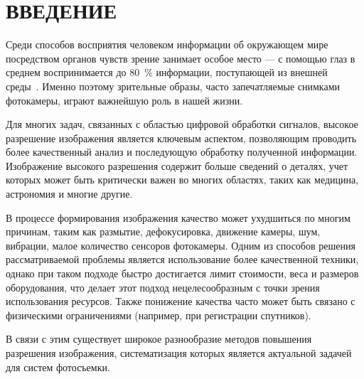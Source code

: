 \chapter*{ВВЕДЕНИЕ}

Среди способов восприятия человеком информации об окружающем мире посредством органов чувств зрение занимает особое место --- с помощью глаз в среднем воспринимается до 80~\% информации, поступающей из внешней среды~\cite{percent}. Именно поэтому зрительные образы, часто запечатляемые снимками фотокамеры, играют важнейшую роль в нашей жизни.

Для многих задач, связанных с областью цифровой обработки сигналов, высокое разрешение изображения является ключевым аспектом, позволяющим проводить более качественный анализ и последующую обработку полученной информации. Изображение высокого разрешения содержит больше сведений о деталях, учет которых может быть критически важен во многих областях, таких как медицина, астрономия и многие другие.

В процессе формирования изображения качество может ухудшиться по многим причинам, таким как размытие, дефокусировка, движение камеры, шум, вибрации, малое количество сенсоров фотокамеры. Одним из способов решения рассматриваемой проблемы является использование более качественной техники, однако при таком подходе быстро достигается лимит стоимости, веса и размеров оборудования, что делает этот подход нецелесообразным с точки зрения использования ресурсов. Также понижение качества часто может быть связано с физическими ограничениями (например, при регистрации спутников).

В связи с этим существует широкое разнообразие методов повышения разрешения изображения, систематизация которых является актуальной задачей для систем фотосъемки.